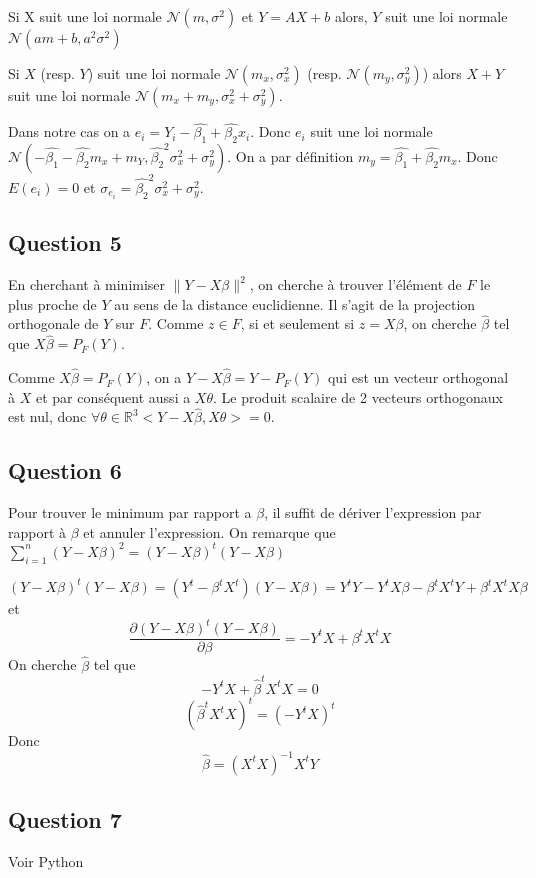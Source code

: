 \documentclass[]{book}
\theoremstyle{definition}
\newcommand{\bb}[1]{\mathbb{#1}}
\newcommand{\R}{\bb{R}}
\begin{document}
Si X suit une loi normale $\mathscr{N}(m, \sigma^2)$ et $Y = AX + b$ alors, $Y$ suit une loi normale $\mathscr{N}(am + b, a^2\sigma^2)$  

Si $X$ (resp. $Y$) suit une loi normale $\mathscr{N}(m_x, \sigma_x^2)$ (resp. $\mathscr{N}(m_y, \sigma_y^2)$) alors $X+Y$ suit une loi normale $\mathscr{N}(m_x + m_y, \sigma_x^2+\sigma_y^2)$.

Dans notre cas on a $e_i = Y_i - \hat{\beta_1} + \hat{\beta_2}x_i$. Donc $e_i$ suit une loi normale  
$\mathscr{N}(- \hat{\beta_1} - \hat{\beta_2}m_x + m_Y, \hat{\beta_2}^2\sigma_x^2+\sigma_y^2)$. On a par d\'efinition $m_y = \hat{\beta_1} + \hat{\beta_2}m_x$. Donc $E(e_i) = 0$ et $\sigma_{e_i} = \hat{\beta_2}^2\sigma_x^2+\sigma_y^2$.


\subsection*{Question 5}
En cherchant \`a minimiser $\lVert Y - X\beta \rVert^2$, on cherche \`a trouver l'\'el\'ement de $F$ le plus proche de $Y$ au sens de la distance euclidienne. Il s'agit de la projection orthogonale de $Y$ sur $F$. Comme $z \in F$, si et seulement si $z = X\beta$, on cherche $\hat{\beta}$ tel que $X\hat{\beta} = P_F(Y)$. 

Comme $X\hat{\beta} = P_F(Y)$, on a $Y - X\hat{\beta} = Y - P_F(Y)$ qui est un vecteur orthogonal \`a $X$ et par cons\'equent aussi a $X\theta$. Le produit scalaire de 2 vecteurs orthogonaux est nul, donc $\forall \theta \in \R^{3} <Y - X\hat{\beta}, X\theta> = 0$.

\subsection*{Question 6}
Pour trouver le minimum par rapport a $\beta$, il suffit de d\'eriver l'expression par rapport \`a $\beta$ et annuler l'expression. On remarque que $\sum_{i=1}^{n}{(Y-X\beta)^2} = (Y-X\beta)^t(Y-X\beta)$

$$
(Y-X\beta)^t(Y-X\beta) = (Y^t-\beta^tX^t)(Y-X\beta) = Y^tY-Y^tX\beta - \beta^tX^tY + \beta^tX^tX\beta
$$
et
$$
\frac{\partial (Y-X\beta)^t(Y-X\beta) }{\partial \beta} = -Y^tX + \beta^tX^tX
$$
On cherche $\hat{\beta}$ tel que
$$
-Y^tX + \hat{\beta}^tX^tX = 0
$$
$$
(\hat{\beta}^tX^tX)^t = (-Y^tX)^t
$$
Donc
$$
\hat{\beta} = (X^tX)^{-1}X^tY
$$

\subsection*{Question 7}
Voir Python
\end{document}
